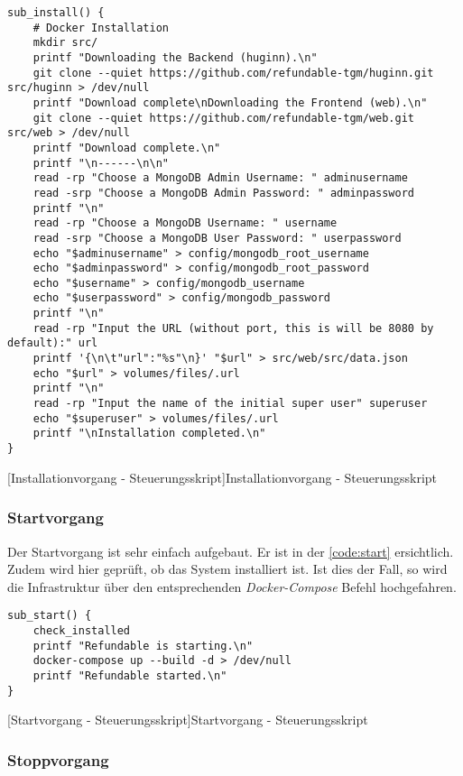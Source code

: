 \begin{verbatim}
sub_install() {
	# Docker Installation
	mkdir src/
	printf "Downloading the Backend (huginn).\n"
	git clone --quiet https://github.com/refundable-tgm/huginn.git src/huginn > /dev/null
	printf "Download complete\nDownloading the Frontend (web).\n"
	git clone --quiet https://github.com/refundable-tgm/web.git src/web > /dev/null
	printf "Download complete.\n"
	printf "\n------\n\n"
	read -rp "Choose a MongoDB Admin Username: " adminusername
	read -srp "Choose a MongoDB Admin Password: " adminpassword
	printf "\n"
	read -rp "Choose a MongoDB Username: " username
	read -srp "Choose a MongoDB User Password: " userpassword
	echo "$adminusername" > config/mongodb_root_username
	echo "$adminpassword" > config/mongodb_root_password
	echo "$username" > config/mongodb_username
	echo "$userpassword" > config/mongodb_password
	printf "\n"
	read -rp "Input the URL (without port, this is will be 8080 by default):" url
	printf '{\n\t"url":"%s"\n}' "$url" > src/web/src/data.json
	echo "$url" > volumes/files/.url
	printf "\n"
	read -rp "Input the name of the initial super user" superuser
	echo "$superuser" > volumes/files/.url
	printf "\nInstallation completed.\n"
}
\end{verbatim}
[Installationvorgang - Steuerungsskript]{Installationvorgang - Steuerungsskript}
\label{code:installer}

\subsubsection{Startvorgang}

Der Startvorgang ist sehr einfach aufgebaut. Er ist in der \autoref{code:start} ersichtlich. Zudem wird hier geprüft, ob das System installiert ist. Ist dies der Fall, so wird die Infrastruktur über den entsprechenden \textit{Docker-Compose} Befehl hochgefahren. 

\newpage

\begin{verbatim}
sub_start() {
	check_installed
	printf "Refundable is starting.\n"
	docker-compose up --build -d > /dev/null
	printf "Refundable started.\n"
}
\end{verbatim}
[Startvorgang - Steuerungsskript]{Startvorgang - Steuerungsskript}
\label{code:start}

\subsubsection{Stoppvorgang}

